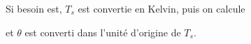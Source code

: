 Si besoin est, $T_s$ est convertie en Kelvin, puis on calcule

et $ \theta $ est converti dans l'unit\'e d'origine de $T_s$.

